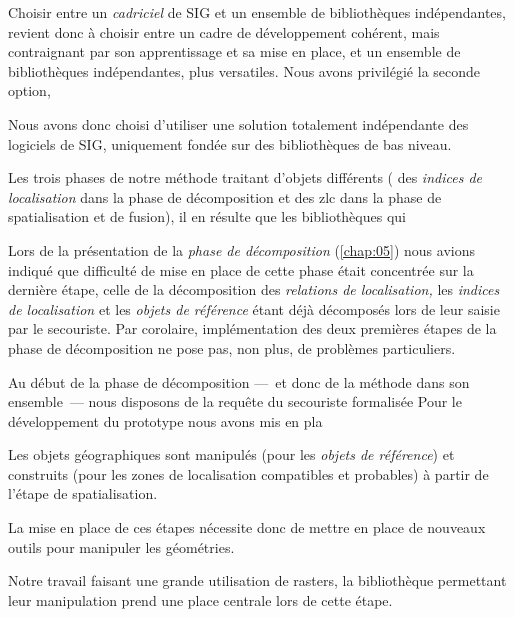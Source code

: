 Choisir entre un \emph{cadriciel} de SIG et un ensemble de
bibliothèques indépendantes, revient donc à choisir entre un cadre de
développement cohérent, mais contraignant par son apprentissage et sa
mise en place, et un ensemble de bibliothèques indépendantes, plus
versatiles. Nous avons privilégié la seconde option, 



Nous avons donc choisi d'utiliser une solution totalement indépendante
des logiciels de SIG, uniquement fondée sur des bibliothèques de bas
niveau.





Les trois phases de notre méthode traitant d'objets différents (\ie
des \emph{indices de localisation} dans la phase de décomposition et
des \ac{zlc} dans la phase de spatialisation et de fusion), il en
résulte que les bibliothèques qui 


Lors de la présentation de la \emph{phase de décomposition}
(\autoref{chap:05}) nous avions indiqué que difficulté de mise en
place de cette phase était concentrée sur la dernière étape, celle de
la décomposition des \emph{relations de localisation,} les
\emph{indices de localisation} et les \emph{objets de référence} étant
déjà décomposés lors de leur saisie par le secouriste. Par corolaire,
implémentation des deux premières étapes de la phase de décomposition
ne pose pas, non plus, de problèmes particuliers.

Au début de la phase de décomposition ---~et donc de la méthode dans
son ensemble~--- nous disposons de la requête du secouriste
formalisée
%
Pour le développement du prototype nous avons mis en pla



Les objets géographiques sont manipulés (pour les \emph{objets de
  référence}) et construits (pour les zones de localisation
compatibles et probables) à partir de l'étape de spatialisation.

La mise en place de ces étapes nécessite donc de mettre en place de
nouveaux outils pour manipuler les géométries.

Notre travail faisant une grande utilisation de rasters, la
bibliothèque permettant leur manipulation prend une place centrale
lors de cette étape.


